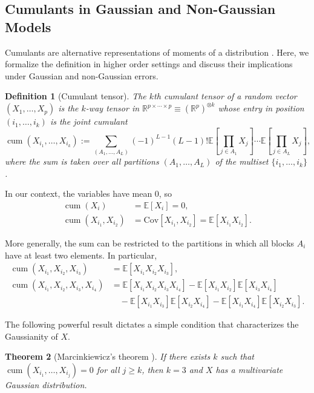 \documentclass[11pt,a4paper]{article}
\numberwithin{equation}{section}
\newtheorem{theorem}{Theorem}[section]
\newtheorem{definition}[theorem]{Definition}
\DeclareMathOperator{\cum}{cum}
\begin{document}
\subsection{Cumulants in Gaussian and Non-Gaussian Models}
\label{subsec:non-gaussian}

Cumulants are alternative representations of moments of a distribution \citep{comon:jutten:handbook}. Here, we formalize the definition in higher order settings and discuss their implications under Gaussian and non-Gaussian errors.

\begin{definition}[Cumulant tensor]
\label{def:cumulant_tensor}
The $k$th cumulant tensor of a random vector $(X_1, \ldots, X_p)$ is the $k$-way tensor in $\mathbb{R}^{p \times \cdots \times p} \equiv (\mathbb{R}^p)^{\otimes k}$ whose entry in position $(i_1, \ldots, i_k)$ is the joint cumulant
\[
\cum(X_{i_1}, \ldots, X_{i_k}) := \sum_{(A_1, \ldots, A_L)} (-1)^{L-1} (L-1)! \mathbb{E}\left[\prod_{j \in A_1} X_j\right] \cdots \mathbb{E}\left[\prod_{j \in A_L} X_j\right],
\]
where the sum is taken over all partitions $(A_1, \ldots, A_L)$ of the multiset $\{i_1, \ldots, i_k\}$.
\end{definition}

In our context, the variables have mean 0, so
\begin{align}
\cum(X_i) &= \mathbb{E}[X_i] = 0, \\
\cum(X_{i_1}, X_{i_2}) &= \text{Cov}[X_{i_1}, X_{i_2}] = \mathbb{E}[X_{i_1} X_{i_2}].
\end{align}

More generally, the sum can be restricted to the partitions in which all blocks $A_i$ have at least two elements. In particular,
\begin{align}
\cum(X_{i_1}, X_{i_2}, X_{i_3}) &= \mathbb{E}[X_{i_1} X_{i_2} X_{i_3}], \\
\cum(X_{i_1}, X_{i_2}, X_{i_3}, X_{i_4}) &= \mathbb{E}[X_{i_1} X_{i_2} X_{i_3} X_{i_4}] - \mathbb{E}[X_{i_1} X_{i_2}] \mathbb{E}[X_{i_3} X_{i_4}] \\
&\quad - \mathbb{E}[X_{i_1} X_{i_3}] \mathbb{E}[X_{i_2} X_{i_4}] - \mathbb{E}[X_{i_1} X_{i_4}] \mathbb{E}[X_{i_2} X_{i_3}].
\end{align}

The following powerful result dictates a simple condition that characterizes the Gaussianity of $X$.

\begin{theorem}[Marcinkiewicz's theorem {\citealp{marcinkiewicz:1939}}]
\label{thm:marcinkiewicz}
If there exists $k$ such that $\cum(X_{i_1}, \ldots, X_{i_j}) = 0$ for all $j \geq k$, then $k = 3$ and $X$ has a multivariate Gaussian distribution.
\end{theorem}
\end{document}
